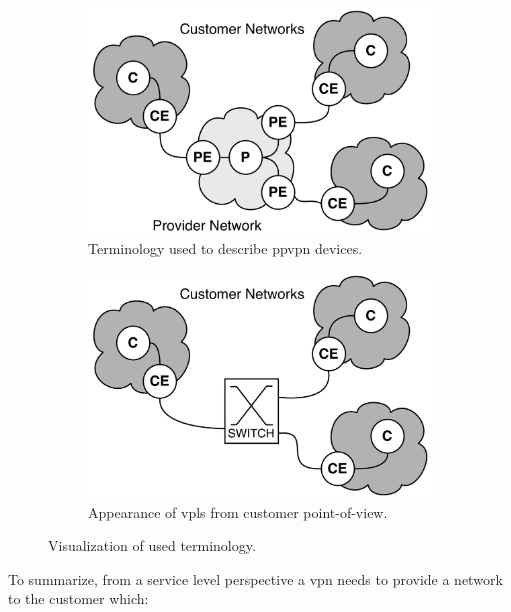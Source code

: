 \begin{figure}[!h]
	\centering
	\begin{subfigure}[h]{0.45\textwidth}
	\centering
		\includegraphics[width=\textwidth]{./includes/ppvpn.pdf}
		\caption{Terminology used to describe \acs{ppvpn} devices.}
		\label{fig:ppvpn}
	\end{subfigure}\hfill
	\begin{subfigure}[h]{0.45\textwidth}
	\centering
		\includegraphics[width=\textwidth]{./includes/ppvpn-cust.pdf}
		\caption{Appearance of \acs{vpls} from customer point-of-view.}
		\label{fig:ppvpn-cust}
	\end{subfigure}
	\caption{Visualization of used terminology.}
\end{figure}

To summarize, from a service level perspective a \ac{vpn} needs to provide a network to the customer which:


